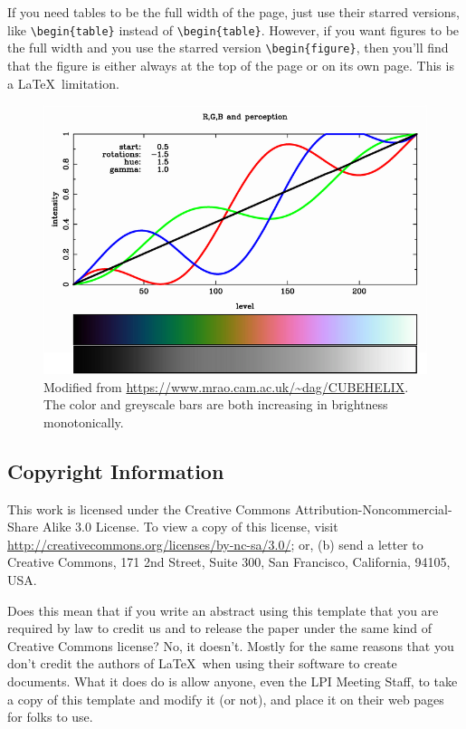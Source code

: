 \documentclass[twoside]{article}
\begin{document}
If you need tables to be the full width of the page, just use their starred versions, like \verb=\begin{table}= instead
of \verb=\begin{table}=. 
However, if you want figures to be the full width and you use the starred version \verb=\begin{figure}=, then you'll find that the figure is either always at the top of the page or on its own page. This is a \LaTeX\ limitation.

\begin{figure}
\begin{center}
\includegraphics[width=\textwidth]{rgb-grey-morehue.png}
\caption[CubeHelix Color Schemes]{
   \label{SaturationColors}
    Modified from \url{https://www.mrao.cam.ac.uk/~dag/CUBEHELIX}. The color and greyscale bars are both increasing in brightness monotonically.
    }
\end{center}
\end{figure}

\subsection*{Copyright Information}

This work is licensed under the Creative Commons Attribution-Noncommercial-Share Alike 3.0 License. 
To view a copy of this license, visit \url{http://creativecommons.org/licenses/by-nc-sa/3.0/}; or, (b) send a letter to Creative Commons, 171 2nd Street, Suite 300, San Francisco, California, 94105, USA.

Does this mean that if you write an abstract using this template that you are required by law to credit us and to release the paper under the same kind of Creative Commons license?  
No, it doesn't.  Mostly for the same reasons that you don't credit the authors of \LaTeX\ when using their software to create documents.  
What it does do is allow anyone, even the LPI Meeting Staff, to take a copy of this template and modify it (or not), and place it on their web pages for folks to use.
\end{document}
